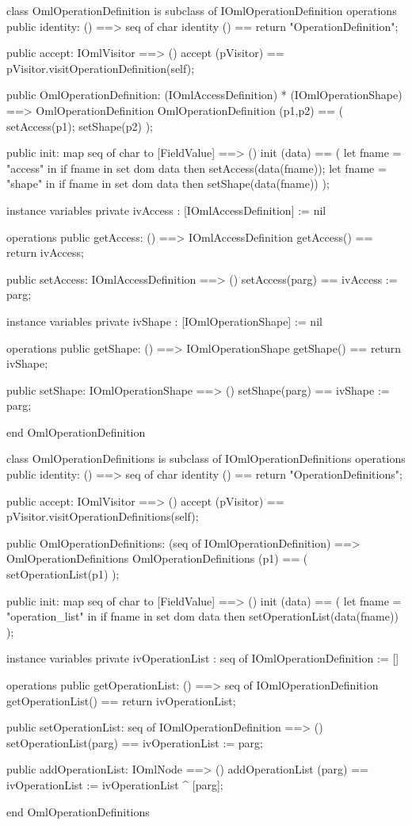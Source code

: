 \begin{vdm_al}
class OmlOperationDefinition is subclass of IOmlOperationDefinition
operations
  public identity: () ==> seq of char
  identity () == return "OperationDefinition";

  public accept: IOmlVisitor ==> ()
  accept (pVisitor) == pVisitor.visitOperationDefinition(self);

  public OmlOperationDefinition:
      (IOmlAccessDefinition) *
      (IOmlOperationShape) ==> OmlOperationDefinition
  OmlOperationDefinition (p1,p2) == 
   ( setAccess(p1);
     setShape(p2) );

  public init: map seq of char to [FieldValue] ==> ()
  init (data) ==
    ( let fname = "access" in
        if fname in set dom data
        then setAccess(data(fname));
      let fname = "shape" in
        if fname in set dom data
        then setShape(data(fname)) );

instance variables
  private ivAccess : [IOmlAccessDefinition] := nil

operations
  public getAccess: () ==> IOmlAccessDefinition
  getAccess() == return ivAccess;

  public setAccess: IOmlAccessDefinition ==> ()
  setAccess(parg) == ivAccess := parg;

instance variables
  private ivShape : [IOmlOperationShape] := nil

operations
  public getShape: () ==> IOmlOperationShape
  getShape() == return ivShape;

  public setShape: IOmlOperationShape ==> ()
  setShape(parg) == ivShape := parg;

end OmlOperationDefinition
\end{vdm_al}

\begin{vdm_al}
class OmlOperationDefinitions is subclass of IOmlOperationDefinitions
operations
  public identity: () ==> seq of char
  identity () == return "OperationDefinitions";

  public accept: IOmlVisitor ==> ()
  accept (pVisitor) == pVisitor.visitOperationDefinitions(self);

  public OmlOperationDefinitions:
      (seq of IOmlOperationDefinition) ==> OmlOperationDefinitions
  OmlOperationDefinitions (p1) == 
   ( setOperationList(p1) );

  public init: map seq of char to [FieldValue] ==> ()
  init (data) ==
    ( let fname = "operation_list" in
        if fname in set dom data
        then setOperationList(data(fname)) );

instance variables
  private ivOperationList : seq of IOmlOperationDefinition := []

operations
  public getOperationList: () ==> seq of IOmlOperationDefinition
  getOperationList() == return ivOperationList;

  public setOperationList: seq of IOmlOperationDefinition ==> ()
  setOperationList(parg) == ivOperationList := parg;

  public addOperationList: IOmlNode ==> ()
  addOperationList (parg) == ivOperationList := ivOperationList ^ [parg];

end OmlOperationDefinitions
\end{vdm_al}

